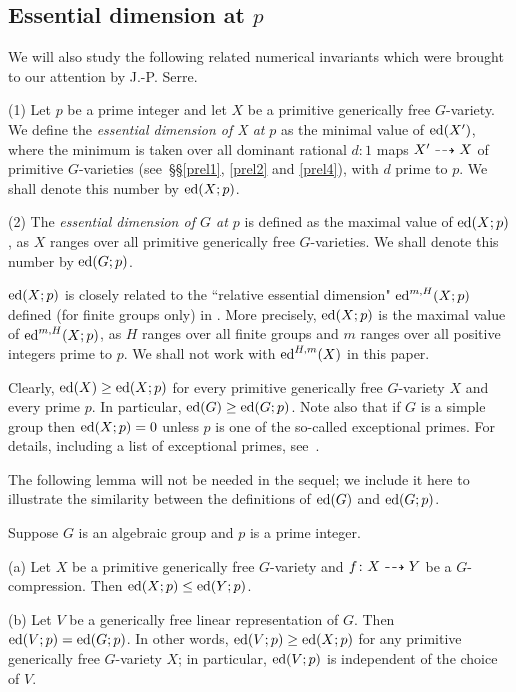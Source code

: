 \subsection*{Essential dimension at $p$}

We will also study the following related numerical invariants which
were brought to our attention by J.-P. Serre. 

\begin{defn} \label{def.edp} 
(1) Let $p$ be a prime integer and let $X$ be a primitive generically free
$G$-variety.  We define the {\em essential dimension of X at} $p$ 
as the minimal value of $\operatorname{ed}(X')$, where the minimum is taken 
over all dominant rational $d:1$ maps $X' \dasharrow X$ of primitive
$G$-varieties (see~\S\S\ref{prel1}, \ref{prel2} and \ref{prel4}),
with $d$ prime to $p$.  We shall denote this number by $\operatorname{ed}(X; p)$.

(2) The {\em essential dimension of $G$ at $p$} is defined as the
maximal value of $\operatorname{ed}(X; p)$, as $X$ ranges over all primitive
generically free $G$-varieties.   We shall denote this number by $\operatorname{ed}(G; p)$.
\end{defn}

\begin{remark} \label{rem.edp} $\operatorname{ed}(X; p)$ is closely related to
the ``relative essential dimension" $\operatorname{ed}^{m, H}(X; p)$
defined (for finite groups only) in \cite[Section 5]{br2}.
More precisely,
$\operatorname{ed}(X; p) $ is the maximal value of $\operatorname{ed}^{m, H}(X; p)$, as $H$ ranges over 
all finite groups and $m$ ranges over all positive integers prime to $p$.
We shall not work with $\operatorname{ed}^{H, m}(X)$ in this paper.
\end{remark}

\begin{remark} \label{rem.except-prime}
Clearly, $\operatorname{ed}(X) \geq \operatorname{ed}(X; p)$ for every primitive generically free
$G$-variety $X$ and every prime $p$.
In particular, $\operatorname{ed}(G) \geq \operatorname{ed}(G; p)$. Note also that if $G$ is a simple
group then $\operatorname{ed}(X; p)=0$ unless $p$ is one of the so-called exceptional 
primes. For details, including a list of exceptional primes, 
see~\cite[Section 2]{serrepp}. 
\end{remark}

The following lemma will not be needed in the sequel; we include it here to
illustrate the similarity between the definitions of 
$\operatorname{ed}(G)$ and $\operatorname{ed}(G; p)$. 

\begin{lem} \label{lem.ed-p}
Suppose $G$ is an algebraic group and $p$ is a prime integer. 

\smallskip
(a) Let $X$ be a primitive generically free $G$-variety and
$f\colon X \dasharrow Y$ be a $G$-compression. Then $\operatorname{ed}(X; p) \leq \operatorname{ed}(Y; p)$. 

\smallskip
(b) Let $V$ be a generically free linear representation of $G$.
Then $\operatorname{ed}(V; p) = \operatorname{ed}(G; p)$. In other words, $\operatorname{ed}(V; p) \geq
\operatorname{ed}(X; p)$ for any primitive generically free $G$-variety $X$; 
in particular, $\operatorname{ed}(V; p)$ is independent of the choice of $V$.
\end{lem}

